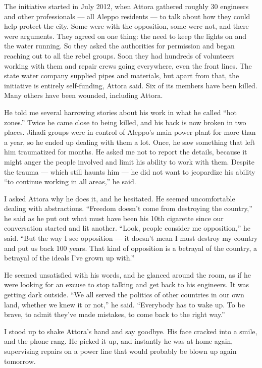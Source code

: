 The initiative started in July 2012, when Attora gathered roughly 30
engineers and other professionals --- all Aleppo residents --- to talk
about how they could help protect the city. Some were with the
opposition, some were not, and there were arguments. They agreed on one
thing: the need to keep the lights on and the water running. So they
asked the authorities for permission and began reaching out to all the
rebel groups. Soon they had hundreds of volunteers working with them and
repair crews going everywhere, even the front lines. The state water
company supplied pipes and materials, but apart from that, the
initiative is entirely self-funding, Attora said. Six of its members
have been killed. Many others have been wounded, including Attora.

He told me several harrowing stories about his work in what he called
``hot zones.'' Twice he came close to being killed, and his back is now
broken in two places. Jihadi groups were in control of Aleppo's main
power plant for more than a year, so he ended up dealing with them a
lot. Once, he saw something that left him traumatized for months. He
asked me not to report the details, because it might anger the people
involved and limit his ability to work with them. Despite the trauma ---
which still haunts him --- he did not want to jeopardize his ability
``to continue working in all areas,'' he said.

I asked Attora why he does it, and he hesitated. He seemed uncomfortable
dealing with abstractions. ``Freedom doesn't come from destroying the
country,'' he said as he put out what must have been his 10th cigarette
since our conversation started and lit another. ``Look, people consider
me opposition,'' he said. ``But the way I see opposition --- it doesn't
mean I must destroy my country and put us back 100 years. That kind of
opposition is a betrayal of the country, a betrayal of the ideals I've
grown up with.''

He seemed unsatisfied with his words, and he glanced around the room, as
if he were looking for an excuse to stop talking and get back to his
engineers. It was getting dark outside. ``We all served the politics of
other countries in our own land, whether we knew it or not,'' he said.
``Everybody has to wake up. To be brave, to admit they've made mistakes,
to come back to the right way.''

I stood up to shake Attora's hand and say goodbye. His face cracked into
a smile, and the phone rang. He picked it up, and instantly he was at
home again, supervising repairs on a power line that would probably be
blown up again tomorrow.


